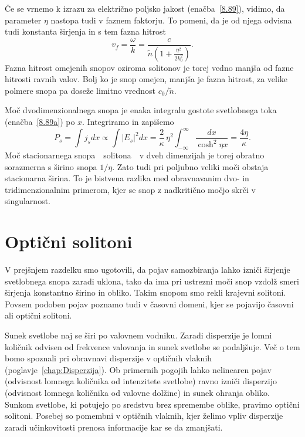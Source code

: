 Če se vrnemo k izrazu za električno poljsko jakost (enačba~\ref{8.89}), vidimo, da
parameter $\eta$ nastopa tudi v faznem faktorju. To pomeni, da je od njega odvisna 
tudi konstanta širjenja in s tem fazna hitrost
\begin{equation}
v_{f}=\frac{\omega}{k} = \frac{c}{\tilde{n}\left(1+\frac{\eta^{2}}{2k_{0}^{2}}\right)}.
\end{equation}
Fazna hitrost omejenih snopov oziroma solitonov je torej vedno manjša od fazne hitrosti ravnih valov. 
Bolj ko je snop omejen, manjša je fazna hitrost, za velike polmere snopa pa doseže 
limitno vrednost $c_0/\tilde{n}$.

Moč dvodimenzionalnega snopa je enaka integralu
gostote svetlobnega toka (enačba~\ref{8.89a}) po $x$. Integriramo in zapišemo 
\begin{equation}
P_s = \int j_s dx \propto \int |E_s|^2 dx  = 
\frac{2}{\kappa}\,\eta^{2}\int_{-\infty}^{\infty}\frac{dx}
{\cosh^{2}\eta x}=\frac{4\eta}{\kappa}.
\label{eq:solj}
\end{equation}
Moč stacionarnega snopa~\textendash~solitona~\textendash~v dveh dimenzijah je 
torej obratno sorazmerna s širino snopa $1/\eta$. Zato tudi pri poljubno veliki moči 
obstaja stacionarna širina. To je bistvena razlika med obravnavanim dvo- in 
tridimenzionalnim primerom, kjer se snop z nadkritično močjo skrči v singularnost.

\section{Optični solitoni}
V prejšnjem razdelku smo ugotovili, da pojav samozbiranja lahko izniči širjenje 
svetlobnega snopa zaradi uklona, tako da ima pri
ustrezni moči snop vzdolž smeri širjenja konstantno širino in obliko. Takim snopom 
smo rekli krajevni solitoni. Povsem podoben pojav poznamo tudi v časovni 
domeni, kjer se pojavijo časovni ali optični solitoni. 

Sunek svetlobe  naj se širi po valovnem vodniku. Zaradi disperzije je lomni količnik
odvisen od frekvence valovanja in sunek svetlobe se podaljšuje. Več o tem bomo spoznali pri 
obravnavi disperzije v optičnih vlaknih (poglavje~\ref{chap:Disperzija}). 
Ob primernih pogojih lahko nelinearen pojav (odvisnost lomnega količnika od intenzitete svetlobe)
ravno izniči disperzijo (odvisnost lomnega količnika od valovne dolžine) in sunek
ohranja obliko. Sunkom svetlobe, ki potujejo po sredstvu brez spremembe
oblike, pravimo optični solitoni. Posebej so pomembni v optičnih vlaknih, 
kjer želimo  vpliv disperzije zaradi učinkovitosti prenosa
informacije kar se da zmanjšati. 

